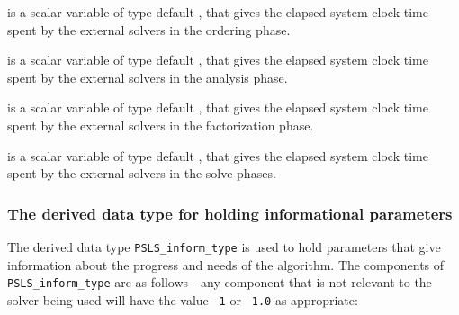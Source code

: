\documentclass{galahad}
\newcommand{\packagename}{PSLS}
\begin{document}
\begin{description}
 is a scalar variable of type default \realdp,
that gives  the elapsed system clock time spent by the external solvers in the
ordering phase.

 is a scalar variable of type default \realdp,
that gives the elapsed system clock time spent by the external solvers in the
analysis phase.

 is a scalar variable of type default \realdp,
that gives the elapsed system clock time spent by the external solvers in the
factorization phase.

 is a scalar variable of type default \realdp,
that gives  the elapsed system clock time spent by the external solvers in the
solve phases.

\end{description}


\subsubsection{The derived data type for holding informational
 parameters}\label{typeinform}
The derived data type
{\tt \packagename\_inform\_type}
is used to hold parameters that give information about the progress and needs
of the algorithm. The components of
{\tt \packagename\_inform\_type}
are as follows---any component that is not relevant to the solver being used
will have the value {\tt -1} or {\tt -1.0} as appropriate:
\end{document}
